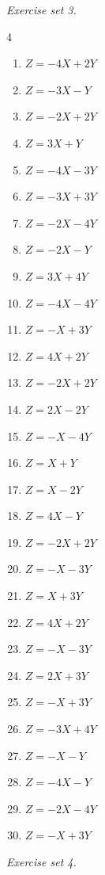 \par\noindent\emph{Exercise set 3.}\nopagebreak
\begin{multicols}{4}\raggedright
\begin{enumerate}[label=\arabic*., leftmargin=*, itemsep=1pt]
\item $Z=-4 X+2 Y$
\item $Z=-3 X- Y$
\item $Z=-2 X+2 Y$
\item $Z=3 X+ Y$
\item $Z=-4 X-3 Y$
\item $Z=-3 X+3 Y$
\item $Z=-2 X-4 Y$
\item $Z=-2 X- Y$
\item $Z=3 X+4 Y$
\item $Z=-4 X-4 Y$
\item $Z=- X+3 Y$
\item $Z=4 X+2 Y$
\item $Z=-2 X+2 Y$
\item $Z=2 X-2 Y$
\item $Z=- X-4 Y$
\item $Z= X+ Y$
\item $Z= X-2 Y$
\item $Z=4 X- Y$
\item $Z=-2 X+2 Y$
\item $Z=- X-3 Y$
\item $Z= X+3 Y$
\item $Z=4 X+2 Y$
\item $Z=- X-3 Y$
\item $Z=2 X+3 Y$
\item $Z=- X+3 Y$
\item $Z=-3 X+4 Y$
\item $Z=- X- Y$
\item $Z=-4 X- Y$
\item $Z=-2 X-4 Y$
\item $Z=- X+3 Y$
\end{enumerate}
\end{multicols}
\par\noindent\emph{Exercise set 4.}\nopagebreak
